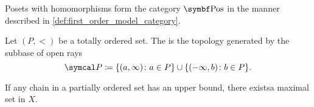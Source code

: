 \begin{definition}\label{def:category_of_posets}
  Posets with homomorphisms form the category \( \Cat{Pos} \) in the manner described in \cref{def:first_order_model_category}.
\end{definition}

\begin{definition}\label{def:order_topology}\cite{nLab:order_topology}
  Let \( (P, <) \) be a totally ordered set. The  is the topology generated by the subbase of open rays
  \begin{equation*}
    \Cal{P} \coloneqq \{ (a, \infty) \colon a \in P \} \cup \{ (-\infty, b) \colon b \in P \}.
  \end{equation*}
\end{definition}

\begin{lemma}\label{thm:zorns_lemma}\cite{nLab:zorns_lemma}
  If any chain in a partially ordered set has an upper bound, there exists\AOC a maximal set in \( X \).
\end{lemma}
